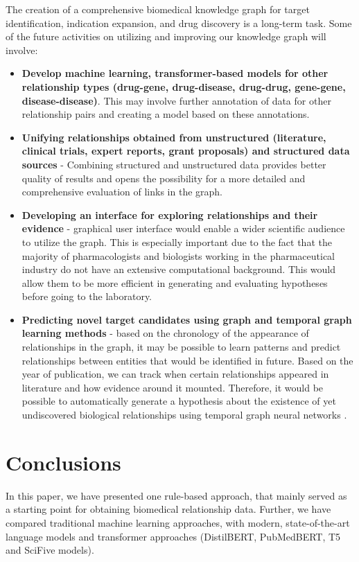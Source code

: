 \documentclass[final,12pt,3p,times,twocolumn,authoryear]{elsarticle}
\begin{document}
The creation of a comprehensive biomedical knowledge graph for target identification, indication expansion, and drug discovery is a long-term task. Some of the future activities on utilizing and improving our knowledge graph will involve: 
\begin{itemize}
\item \textbf{Develop machine learning, transformer-based models for other relationship types (drug-gene, drug-disease, drug-drug, gene-gene, disease-disease)}. This may involve further annotation of data for other relationship pairs and creating a model based on these annotations. 
\item \textbf{Unifying relationships obtained from unstructured (literature, clinical trials, expert reports, grant proposals) and structured data sources} - Combining structured and unstructured data provides better quality of results and opens the possibility for a more detailed and comprehensive evaluation of links in the graph. 
\item \textbf{Developing an interface for exploring relationships and their evidence} - graphical user interface would enable a wider scientific audience to utilize the graph. This is especially important due to the fact that the majority of pharmacologists and biologists working in the pharmaceutical industry do not have an extensive computational background. This would allow them to be more efficient in generating and evaluating hypotheses before going to the laboratory. 
\item \textbf{Predicting novel target candidates using graph and temporal graph learning methods} - based on the chronology of the appearance of relationships in the graph, it may be possible to learn patterns and predict relationships between entities that would be identified in future. Based on the year of publication, we can track when certain relationships appeared in literature and how evidence around it mounted. Therefore, it would be possible to automatically generate a hypothesis about the existence of yet undiscovered biological relationships using temporal graph neural networks \citep{wang2020traffic}.
\end{itemize}

\section{Conclusions}

In this paper, we have presented one rule-based approach, that mainly served as a starting point for obtaining biomedical relationship data. Further, we have compared traditional machine learning approaches, with modern, state-of-the-art language models and transformer approaches (DistilBERT, PubMedBERT, T5 and SciFive models). 
\end{document}
